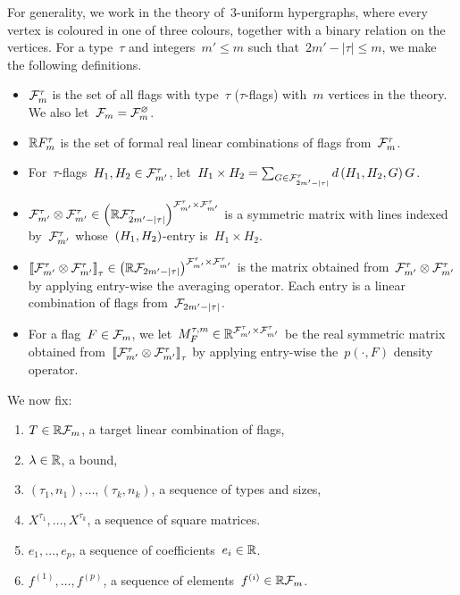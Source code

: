 \documentclass[11pt,a4paper,reqno]{amsart}
\begin{document}
For generality, we work in the theory of~$3$-uniform hypergraphs, where every vertex
is coloured in one of three colours, together with a binary relation on the
vertices. For a type~$\tau$ and integers~$m' \leq m$ such
that~$2m' - \left|\tau\right| \leq m$, we make the following definitions.
\begin{itemize}
\item ${\mathcal F}_m^\tau$ is the set of all flags with type~$\tau$ ($\tau$-flags) with~$m$ vertices in
  the theory. We also let~${\mathcal F}_m = {\mathcal F}_m^\varnothing$.
\item ${\mathbb R} F_m^\tau$ is the set of formal real linear combinations of flags
  from~${\mathcal F}_m^{\tau}$.
\item For~$\tau$-flags~$H_1, H_2 \in {\mathcal F}_{m'}^{\tau}$,
  let~$H_1 \times H_2 = \sum_{G \in {\mathcal F}_{2m' - \left| \tau \right|}^\tau} d\left(H_1, H_2, G\right) G$.
\item
  ${\mathcal F}_{m'}^{\tau} \otimes {\mathcal F}_{m'}^{\tau} \in \left({\mathbb R} {\mathcal F}_{2m' -
      \left|\tau\right|}^\tau\right)^{{\mathcal F}_{m'}^\tau \times {\mathcal F}_{m'}^\tau}$ is a symmetric matrix with lines
  indexed by~${\mathcal F}_{m'}^{\tau}$ whose~$\left(H_1, H_2\right)$-entry is~$H_1 \times H_2$.
\item
  $\left\llbracket {\mathcal F}_{m'}^{\tau} \otimes {\mathcal F}_{m'}^{\tau} \right\rrbracket_{\tau} \in \left({\mathbb R} {\mathcal F}_{2m' -
      \left|\tau\right|}\right)^{{\mathcal F}_{m'}^\tau \times {\mathcal F}_{m'}^\tau}$ is the matrix obtained
  from~${\mathcal F}_{m'}^{\tau} \otimes {\mathcal F}_{m'}^{\tau}$ by applying entry-wise the averaging
  operator. Each entry is a linear combination of flags
  from~${\mathcal F}_{2m' - \left|\tau\right|}$.
\item For a flag~$F \in {\mathcal F}_m$, we
  let~$M_F^{\tau, m} \in {\mathbb R}^{{\mathcal F}_{m'}^\tau \times {\mathcal F}_{m'}^\tau}$ be the real symmetric matrix
  obtained from~$\left\llbracket {\mathcal F}_{m'}^{\tau} \otimes {\mathcal F}_{m'}^{\tau} \right\rrbracket_{\tau}$ by applying
  entry-wise the~$p(\cdot, F)$ density operator.
\end{itemize}
We now fix:
\begin{enumerate}[label=(\textit{\roman*})]
\item\label{item:target} $T \in {\mathbb R}{\mathcal F}_m$, a target linear combination of flags,
\item\label{item:result} $\lambda \in {\mathbb R}$, a bound,
\item\label{item:types} $(\tau_1, n_1), \dots, (\tau_k, n_k)$, a sequence of types and sizes,
\item\label{item:matrices} $X^{\tau_1}, \dots, X^{\tau_k}$, a sequence of square matrices.
\item\label{item:e_vector} $e_1, \dots, e_p$, a sequence of coefficients~$e_i \in {\mathbb R}$.
\item\label{item:positives} $f^{(1)}, \dots, f^{(p)}$, a sequence of elements~$f^{(i)} \in {\mathbb R}{\mathcal F}_m$.
\end{enumerate}
\end{document}
